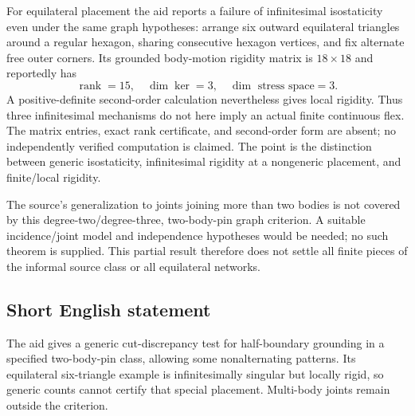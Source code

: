 \documentclass[11pt]{article}
\begin{document}
For equilateral placement the aid reports a failure of infinitesimal isostaticity even under the same graph hypotheses: arrange six outward equilateral triangles around a regular hexagon, sharing consecutive hexagon vertices, and fix alternate free outer corners. Its grounded body-motion rigidity matrix is \(18\times18\) and reportedly has
\[
 \operatorname{rank}=15,\quad\dim\ker=3,\quad
 \dim\text{ stress space}=3.
\]
A positive-definite second-order calculation nevertheless gives local rigidity. Thus three infinitesimal mechanisms do not here imply an actual finite continuous flex. The matrix entries, exact rank certificate, and second-order form are absent; no independently verified computation is claimed. The point is the distinction between generic isostaticity, infinitesimal rigidity at a nongeneric placement, and finite/local rigidity.

The source's generalization to joints joining more than two bodies is not covered by this degree-two/degree-three, two-body-pin graph criterion. A suitable incidence/joint model and independence hypotheses would be needed; no such theorem is supplied. This partial result therefore does not settle all finite pieces of the informal source class or all equilateral networks.
\subsection{Short English statement}
The aid gives a generic cut-discrepancy test for half-boundary grounding in a specified two-body-pin class, allowing some nonalternating patterns. Its equilateral six-triangle example is infinitesimally singular but locally rigid, so generic counts cannot certify that special placement. Multi-body joints remain outside the criterion.
\end{document}
